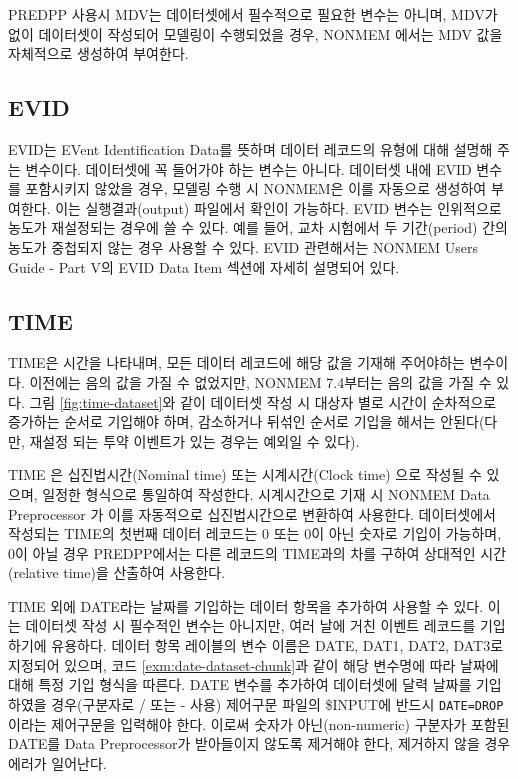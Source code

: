 \documentclass[
  11pt,
  krantz2, a4paper, twoside]{krantz}
\theoremstyle{definition}
\theoremstyle{definition}
\theoremstyle{definition}
\theoremstyle{remark}
\begin{document}
PREDPP 사용시 MDV는 데이터셋에서 필수적으로 필요한 변수는 아니며, MDV가 없이 데이터셋이 작성되어 모델링이 수행되었을 경우, NONMEM 에서는 MDV 값을 자체적으로 생성하여 부여한다.

\hypertarget{evid}{%
\subsection{EVID}\label{evid}}


EVID는 EVent Identification Data를 뜻하며 데이터 레코드의 유형에 대해 설명해 주는 변수이다. 데이터셋에 꼭 들어가야 하는 변수는 아니다. 데이터셋 내에 EVID 변수를 포함시키지 않았을 경우, 모델링 수행 시 NONMEM은 이를 자동으로 생성하여 부여한다. 이는 실행결과(output) 파일에서 확인이 가능하다. EVID 변수는 인위적으로 농도가 재설정되는 경우에 쓸 수 있다. 예를 들어, 교차 시험에서 두 기간(period) 간의 농도가 중첩되지 않는 경우 사용할 수 있다. EVID 관련해서는 NONMEM Users Guide - Part V의 EVID Data Item 섹션에 자세히 설명되어 있다.

\hypertarget{time}{%
\subsection{TIME}\label{time}}


TIME은 시간을 나타내며, 모든 데이터 레코드에 해당 값을 기재해 주어야하는 변수이다. 이전에는 음의 값을 가질 수 없었지만, NONMEM 7.4부터는 음의 값을 가질 수 있다. 그림 \ref{fig:time-dataset}와 같이 데이터셋 작성 시 대상자 별로 시간이 순차적으로 증가하는 순서로 기입해야 하며, 감소하거나 뒤섞인 순서로 기입을 해서는 안된다(다만, 재설정 되는 투약 이벤트가 있는 경우는 예외일 수 있다).

TIME 은 십진법시간(Nominal time) 또는 시계시간(Clock time) 으로 작성될 수 있으며, 일정한 형식으로 통일하여 작성한다. 시계시간으로 기재 시 NONMEM Data Preprocessor 가 이를 자동적으로 십진법시간으로 변환하여 사용한다. 데이터셋에서 작성되는 TIME의 첫번째 데이터 레코드는 0 또는 0이 아닌 숫자로 기입이 가능하며, 0이 아닐 경우 PREDPP에서는 다른 레코드의 TIME과의 차를 구하여 상대적인 시간(relative time)을 산출하여 사용한다.

TIME 외에 DATE라는 날짜를 기입하는 데이터 항목을 추가하여 사용할 수 있다. 이는 데이터셋 작성 시 필수적인 변수는 아니지만, 여러 날에 거친 이벤트 레코드를 기입하기에 유용하다. 데이터 항목 레이블의 변수 이름은 DATE, DAT1, DAT2, DAT3로 지정되어 있으며, 코드 \ref{exm:date-dataset-chunk}과 같이 해당 변수명에 따라 날짜에 대해 특정 기입 형식을 따른다. DATE 변수를 추가하여 데이터셋에 달력 날짜를 기입하였을 경우(구분자로 / 또는 - 사용) 제어구문 파일의 \$INPUT에 반드시 \texttt{DATE=DROP}이라는 제어구문을 입력해야 한다. 이로써 숫자가 아닌(non-numeric) 구분자가 포함된 DATE를 Data Preprocessor가 받아들이지 않도록 제거해야 한다, 제거하지 않을 경우 에러가 일어난다.
\end{document}
